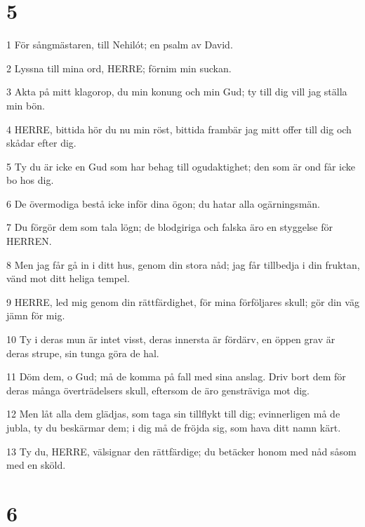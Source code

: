 \chapter{5}

\par 1 För sångmästaren, till Nehilót; en psalm av David.
\par 2 Lyssna till mina ord, HERRE; förnim min suckan.
\par 3 Akta på mitt klagorop, du min konung och min Gud; ty till dig vill jag ställa min bön.
\par 4 HERRE, bittida hör du nu min röst, bittida frambär jag mitt offer till dig och skådar efter dig.
\par 5 Ty du är icke en Gud som har behag till ogudaktighet; den som är ond får icke bo hos dig.
\par 6 De övermodiga bestå icke inför dina ögon; du hatar alla ogärningsmän.
\par 7 Du förgör dem som tala lögn; de blodgiriga och falska äro en styggelse för HERREN.
\par 8 Men jag får gå in i ditt hus, genom din stora nåd; jag får tillbedja i din fruktan, vänd mot ditt heliga tempel.
\par 9 HERRE, led mig genom din rättfärdighet, för mina förföljares skull; gör din väg jämn för mig.
\par 10 Ty i deras mun är intet visst, deras innersta är fördärv, en öppen grav är deras strupe, sin tunga göra de hal.
\par 11 Döm dem, o Gud; må de komma på fall med sina anslag. Driv bort dem för deras många överträdelsers skull, eftersom de äro gensträviga mot dig.
\par 12 Men låt alla dem glädjas, som taga sin tillflykt till dig; evinnerligen må de jubla, ty du beskärmar dem; i dig må de fröjda sig, som hava ditt namn kärt.
\par 13 Ty du, HERRE, välsignar den rättfärdige; du betäcker honom med nåd såsom med en sköld.

\chapter{6}


